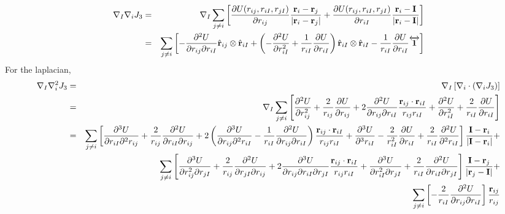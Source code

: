 \documentclass[letterpaper]{article}
\begin{document}
\begin{eqnarray}
\nabla_I \nabla_i J_3 & = & \nabla_I \sum_{j \neq i}
\left[\frac{\partial U(r_{ij}, r_{iI},r_{jI})}{\partial r_{ij}}
  \frac{\mathbf{r}_i - \mathbf{r}_j}{|\mathbf{r}_i - \mathbf{r}_j|} 
+ \frac{\partial U(r_{ij}, r_{iI},r_{jI})}{\partial r_{iI}}
  \frac{\mathbf{r}_i - \mathbf{I}}{|\mathbf{r}_i - \mathbf{I}|}  \right] \\\nonumber 
& = & \sum_{j\neq i} \left[ -\frac{\partial^2 U}{\partial r_{ij} \partial r_{iI}} \hat{\mathbf{r}}_{ij} \otimes \hat{\mathbf{r}}_{iI} +
\left(-\frac{\partial^2 U}{\partial r_{iI}^2}  + \frac{1}{r_{iI}}\frac{\partial U}{\partial r_{iI}} \right) 
\hat{\mathbf{r}}_{iI} \otimes \hat{\mathbf{r}}_{iI} - \frac{1}{r_{iI}}\frac{\partial U}{\partial r_{iI}} \overleftrightarrow{\mathbf{1}}
\right]
\end{eqnarray}
For the laplacian,
\begin{eqnarray}
\nabla_I \nabla_i^2 J_3 & = & \nabla_I\left[\nabla_i \cdot \left(\nabla_i J_3\right)\right] \\
& = & \nabla_I \sum_{j\neq i } \left[
\frac{\partial^2 U}{\partial r_{ij}^2} + \frac{2}{r_{ij}} \frac{\partial
  U}{\partial r_{ij}} + 2 \frac{\partial^2 U}{\partial r_{ij} \partial
  r_{iI}}\frac{\mathbf{r}_{ij}\cdot\mathbf{r}_{iI}}{r_{ij}r_{iI}} +\frac{\partial^2 U}{\partial
  r_{iI}^2}
+ \frac{2}{r_{iI}}\frac{\partial U}{\partial r_{iI}} \nonumber
\right] \\
& = & \sum_{j\neq i } 
\left[ \frac{\partial^3 U}{\partial r_{iI} \partial^2 r_{ij}} +
\frac{2}{r_{ij}} \frac{\partial^2 U}{\partial r_{iI} \partial r_{ij}}
+ 2\left(\frac{\partial^3 U}{\partial r_{ij} \partial^2 r_{iI}} -\frac{1}{r_{iI}} \frac{\partial^2 U}{\partial r_{ij} \partial r_{iI}}\right)\frac{\mathbf{r}_{ij}\cdot\mathbf{r}_{iI}}{r_{ij}r_{iI}} + \frac{\partial^3 U}{\partial^3 r_{iI}} - \frac{2}{r_{iI}^2} \frac{\partial U}{ \partial r_{iI}} + \frac{2}{r_{iI}} \frac{\partial^2 U}{\partial^2 r_{iI}}
\right] \frac{\mathbf{I} - \mathbf{r}_i}{|\mathbf{I} - \mathbf{r}_i|} + \nonumber \\\nonumber 
 & & \sum_{j\neq i } \left[ \frac{\partial^3U}{\partial r_{ij}^2 \partial r_{jI}} + \frac{2}{r_{ij}}\frac{\partial^2 U}{\partial r_{jI} \partial r_{ij}} 
+ 2\frac{\partial^3 U}{\partial r_{ij} \partial r_{iI} \partial r_{jI}}\frac{\mathbf{r}_{ij}\cdot\mathbf{r}_{iI}}{r_{ij}r_{iI}}
+\frac{\partial^3 U}{\partial r_{iI}^2 \partial r_{jI}} + \frac{2}{r_{iI}}\frac{\partial^2 U}{\partial r_{iI} \partial r_{jI}} \right] 
\frac{\mathbf{I} - \mathbf{r}_j}{|\mathbf{r}_j - \mathbf{I}|} + \\\nonumber 
& & \sum_{j\neq i } \left[ -\frac{2}{r_{iI}}\frac{\partial^2 U}{\partial r_{ij} \partial r_{iI}}\right] \frac{\mathbf{r}_{ij}}{r_{ij}}
\end{eqnarray}
\end{document}
